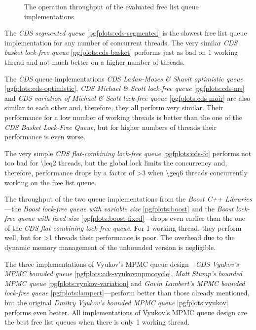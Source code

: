 \begin{@empty}
\begin{figure}[ht!]
{
        }
        \caption{The operation throughput of the evaluated free list queue implementations}
        \label{fig:free_list_performance}
    \end{figure}

    The \emph{CDS segmented queue} \ref{pgfplots:cds-segmented} is the slowest free list queue implementation for any number of concurrent threads. The very similar \emph{CDS basket lock-free queue} \ref{pgfplots:cds-basket} performs just as bad on \num{1} working thread and not much better on a higher number of threads.

    The \emph{CDS} queue implementations \emph{CDS Ladan-Mozes \& Shavit optimistic queue} \ref{pgfplots:cds-optimistic}, \emph{CDS Michael \& Scott lock-free queue} \ref{pgfplots:cds-ms} and \emph{CDS variation of Michael \& Scott lock-free queue} \ref{pgfplots:cds-moir} are also similar to each other and, therefore, they all perform very similar. Their performance for a low number of working threads is better than the one of the \emph{CDS Basket Lock-Free Queue}, but for higher numbers of threads their performance is even worse.

    The very simple \emph{CDS flat-combining lock-free queue} \ref{pgfplots:cds-fc} performs not too bad for \num{\leq2} threads, but the global lock limits the concurrency and, therefore, performance drops by a factor of \num{>3} when \num{\geq6} threads concurrently working on the free list queue.

    The throughput of the two queue implementations from the \textit{Boost C++ Libraries}---the \emph{Boost lock-free queue with variable size} \ref{pgfplots:boost} and the \emph{Boost lock-free queue with fixed size} \ref{pgfplots:boost-fixed}---drops even earlier than the one of the \emph{CDS flat-combining lock-free queue}. For \num{1} working thread, they perform well, but for \num{>1} threads their performance is poor. The overhead due to the dynamic memory management of the unbounded version is negligible.

    The three implementations of Vyukov's MPMC queue design---\emph{CDS Vyukov's MPMC bounded queue} \ref{pgfplots:cds-vyukovmpmccycle}, \emph{Matt Stump's bounded MPMC queue} \ref{pgfplots:vyukov-variation} and \emph{Gavin Lambert's MPMC bounded lock-free queue} \ref{pgfplots:lampert}---perform better than those already mentioned, but the original \emph{Dmitry Vyukov's bounded MPMC queue} \ref{pgfplots:vyukov} performs even better. All implementations of Vyukov's MPMC queue design are the best free list queues when there is only \num{1} working thread.


\end{@empty}

